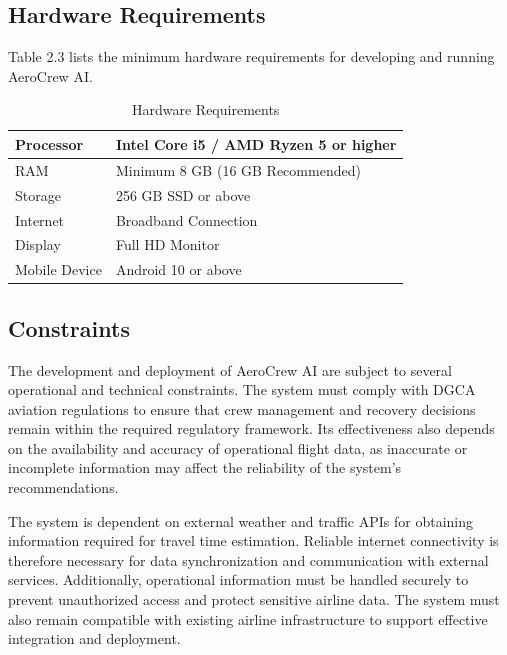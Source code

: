 \documentclass[12pt,a4paper]{report}
\begin{document}
\subsection{Hardware Requirements}

Table 2.3 lists the minimum hardware requirements for developing and running AeroCrew AI.

\begin{table}[H]
\centering
\caption{Hardware Requirements}

\begin{tabular}{|p{5cm}|p{8cm}|}
\hline

Processor & Intel Core i5 / AMD Ryzen 5 or higher\\
\hline

RAM & Minimum 8 GB (16 GB Recommended)\\
\hline

Storage & 256 GB SSD or above\\
\hline

Internet & Broadband Connection\\
\hline

Display & Full HD Monitor\\
\hline

Mobile Device & Android 10 or above\\
\hline

\end{tabular}

\end{table}

\subsection{Constraints}

The development and deployment of AeroCrew AI are subject to several operational and technical constraints. The system must comply with DGCA aviation regulations to ensure that crew management and recovery decisions remain within the required regulatory framework. Its effectiveness also depends on the availability and accuracy of operational flight data, as inaccurate or incomplete information may affect the reliability of the system's recommendations.

The system is dependent on external weather and traffic APIs for obtaining information required for travel time estimation. Reliable internet connectivity is therefore necessary for data synchronization and communication with external services. Additionally, operational information must be handled securely to prevent unauthorized access and protect sensitive airline data. The system must also remain compatible with existing airline infrastructure to support effective integration and deployment.
\end{document}
